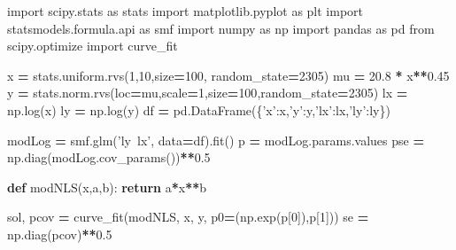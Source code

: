 \documentclass[polish,]{book}
\newenvironment{Shaded}{\begin{snugshade}}{\end{snugshade}}
\newcommand{\ControlFlowTok}[1]{\textcolor[rgb]{0.13,0.29,0.53}{\textbf{#1}}}
\newcommand{\DecValTok}[1]{\textcolor[rgb]{0.00,0.00,0.81}{#1}}
\newcommand{\FloatTok}[1]{\textcolor[rgb]{0.00,0.00,0.81}{#1}}
\newcommand{\ImportTok}[1]{#1}
\newcommand{\KeywordTok}[1]{\textcolor[rgb]{0.13,0.29,0.53}{\textbf{#1}}}
\newcommand{\NormalTok}[1]{#1}
\newcommand{\OperatorTok}[1]{\textcolor[rgb]{0.81,0.36,0.00}{\textbf{#1}}}
\newcommand{\StringTok}[1]{\textcolor[rgb]{0.31,0.60,0.02}{#1}}
\begin{document}
\begin{Shaded}
\begin{Highlighting}[]
\ImportTok{import}\NormalTok{ scipy.stats }\ImportTok{as}\NormalTok{ stats}
\ImportTok{import}\NormalTok{ matplotlib.pyplot }\ImportTok{as}\NormalTok{ plt}
\ImportTok{import}\NormalTok{ statsmodels.formula.api }\ImportTok{as}\NormalTok{ smf}
\ImportTok{import}\NormalTok{ numpy }\ImportTok{as}\NormalTok{ np}
\ImportTok{import}\NormalTok{ pandas }\ImportTok{as}\NormalTok{ pd}
\ImportTok{from}\NormalTok{ scipy.optimize }\ImportTok{import}\NormalTok{ curve_fit}

\NormalTok{x }\OperatorTok{=}\NormalTok{ stats.uniform.rvs(}\DecValTok{1}\NormalTok{,}\DecValTok{10}\NormalTok{,size}\OperatorTok{=}\DecValTok{100}\NormalTok{, random_state}\OperatorTok{=}\DecValTok{2305}\NormalTok{)}
\NormalTok{mu }\OperatorTok{=} \FloatTok{20.8} \OperatorTok{*}\NormalTok{ x}\OperatorTok{**}\FloatTok{0.45}
\NormalTok{y }\OperatorTok{=}\NormalTok{ stats.norm.rvs(loc}\OperatorTok{=}\NormalTok{mu,scale}\OperatorTok{=}\DecValTok{1}\NormalTok{,size}\OperatorTok{=}\DecValTok{100}\NormalTok{,random_state}\OperatorTok{=}\DecValTok{2305}\NormalTok{)}
\NormalTok{lx }\OperatorTok{=}\NormalTok{ np.log(x)}
\NormalTok{ly }\OperatorTok{=}\NormalTok{ np.log(y)}
\NormalTok{df }\OperatorTok{=}\NormalTok{ pd.DataFrame(\{}\StringTok{'x'}\NormalTok{:x,}\StringTok{'y'}\NormalTok{:y,}\StringTok{'lx'}\NormalTok{:lx,}\StringTok{'ly'}\NormalTok{:ly\})}

\NormalTok{modLog }\OperatorTok{=}\NormalTok{ smf.glm(}\StringTok{'ly~lx'}\NormalTok{, data}\OperatorTok{=}\NormalTok{df).fit()}
\NormalTok{p }\OperatorTok{=}\NormalTok{ modLog.params.values}
\NormalTok{pse }\OperatorTok{=}\NormalTok{ np.diag(modLog.cov_params())}\OperatorTok{**}\FloatTok{0.5}

\KeywordTok{def}\NormalTok{ modNLS(x,a,b):}
    \ControlFlowTok{return}\NormalTok{ a}\OperatorTok{*}\NormalTok{x}\OperatorTok{**}\NormalTok{b}

\NormalTok{sol, pcov }\OperatorTok{=}\NormalTok{ curve_fit(modNLS, x, y, p0}\OperatorTok{=}\NormalTok{(np.exp(p[}\DecValTok{0}\NormalTok{]),p[}\DecValTok{1}\NormalTok{]))}
\NormalTok{se }\OperatorTok{=}\NormalTok{ np.diag(pcov)}\OperatorTok{**}\FloatTok{0.5}


\end{Highlighting}
\end{Shaded}
\end{document}
